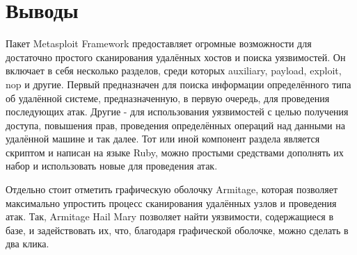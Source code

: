\documentclass[a4paper]{article}
\begin{document}
\section{Выводы}

Пакет Metasploit Framework предоставляет огромные возможности для достаточно простого сканирования удалённых хостов и поиска уязвимостей. Он включает в себя несколько разделов, среди которых auxiliary, payload, exploit, nop и другие. Первый предназначен для поиска информации определённого типа об удалённой системе, предназначенную, в первую очередь, для проведения последующих атак. Другие - для использования уязвимостей с целью получения доступа, повышения прав, проведения определённых операций над данными на удалённой машине и так далее. Тот или иной компонент раздела является скриптом и написан на языке Ruby, можно простыми средствами дополнять их набор и использовать новые для проведения атак.

Отдельно стоит отметить графическую оболочку Armitage, которая позволяет максимально упростить процесс сканирования удалённых узлов и проведения атак. Так, Armitage Hail Mary позволяет найти уязвимости, содержащиеся в базе, и задействовать их, что, благодаря графической оболочке, можно сделать в два клика.
\end{document}
